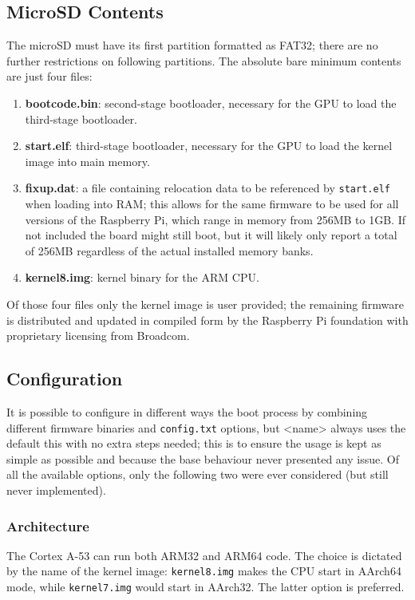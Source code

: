 \documentclass[12pt,a4paper,openright,twoside]{report}
\begin{document}
\subsection{MicroSD Contents}
The microSD must have its first partition formatted as FAT32; there are no 
further restrictions on following partitions. The absolute bare minimum contents 
are just four files:
\begin{enumerate}
    \item \textbf{bootcode.bin}: second-stage bootloader, necessary for the GPU
            to load the third-stage bootloader.
    \item \textbf{start.elf}: third-stage bootloader, necessary for the GPU to load
            the kernel image into main memory.
    \item \textbf{fixup.dat}: a file containing relocation data to be referenced 
            by {\tt start.elf} when loading into RAM; this allows for the same firmware 
            to be used for all versions of the Raspberry Pi, which range in 
            memory from 256MB to 1GB. If not included the board might still boot,
            but it will likely only report a total of 256MB regardless of the
            actual installed memory banks.
    \item \textbf{kernel8.img}: kernel binary for the ARM CPU.
\end{enumerate}
Of those four files only the kernel image is user provided; the remaining firmware
is distributed and updated in compiled form by the Raspberry Pi foundation with
proprietary licensing from Broadcom.

\subsection{Configuration}
It is possible to configure in different ways the boot process by combining
different firmware binaries and {\tt config.txt} options, but <name> always uses
the default this with no extra steps needed; this is to ensure the usage is kept
as simple as possible and because the base behaviour never presented any issue.
Of all the available options, only the following two were ever considered 
(but still never implemented).

\subsubsection{Architecture}
The Cortex A-53 can run both ARM32 and ARM64 code. The choice is dictated by the
name of the kernel image: {\tt kernel8.img} makes the CPU start in AArch64 mode,
while {\tt kernel7.img} would start in AArch32. The latter option is preferred.
\end{document}
